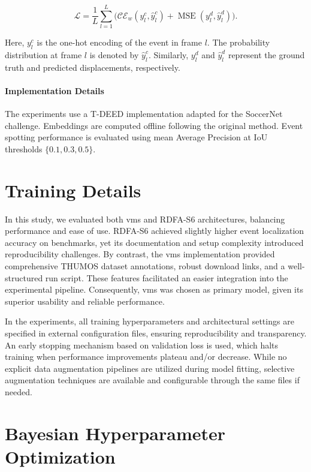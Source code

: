 \[
\mathcal{L} = \frac{1}{L}\sum_{l=1}^{L}\Big(\mathcal{CE}_{w}(y_l^{c},\hat{y}_l^c) + \operatorname{MSE}(y_l^{d},\hat{y}_l^d)\Big).
\]

Here, \(y_l^{c}\) is the one-hot encoding of the event in frame \(l\). The probability distribution at frame \(l\) is denoted by \(\hat{y}_l^c\). Similarly, \(y_l^{d}\) and \(\hat{y}_l^d\) represent the ground truth and predicted displacements, respectively.

\paragraph{Implementation Details} The experiments use a T-DEED implementation adapted for the SoccerNet challenge. Embeddings are computed offline following the original method. Event spotting performance is evaluated using mean Average Precision at IoU thresholds \(\{0.1,0.3,0.5\}\).


\section{Training Details}

In this study, we evaluated both \acrshort{vms} and RDFA-S6 architectures, balancing performance and ease of use. RDFA-S6 achieved slightly higher event localization accuracy on benchmarks, yet its documentation and setup complexity introduced reproducibility challenges. By contrast, the \acrshort{vms} implementation provided comprehensive THUMOS dataset annotations, robust download links, and a well-structured run script. These features facilitated an easier integration into the experimental pipeline. Consequently, \acrshort{vms} was chosen as primary model, given its superior usability and reliable performance.

In the experiments, all training hyperparameters and architectural settings are specified in external configuration files, ensuring reproducibility and transparency. An early stopping mechanism based on validation loss is used, which halts training when performance improvements plateau and/or decrease. While no explicit data augmentation pipelines are utilized during model fitting, selective augmentation techniques are available and configurable through the same files if needed.

\section{Bayesian Hyperparameter Optimization}
\label{sec:bayesian_optimization}

